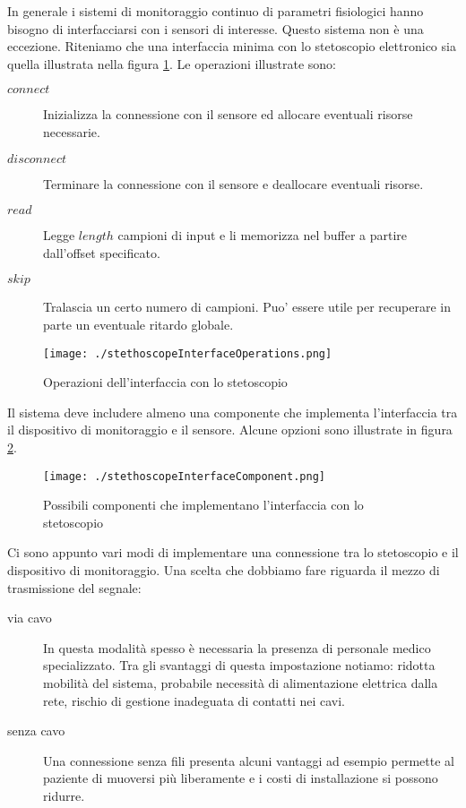 


In generale i sistemi di monitoraggio continuo di parametri fisiologici hanno bisogno di interfacciarsi con i sensori di interesse. 
Questo sistema non \`e una eccezione. 
Riteniamo che una interfaccia minima con lo stetoscopio elettronico sia quella illustrata nella figura \ref{interfacciastetoscopiominima}. Le operazioni illustrate sono:
\begin{description}
  \item[$connect$]
    Inizializza la connessione con il sensore ed allocare eventuali risorse necessarie.
  \item[$disconnect$]
    Terminare la connessione con il sensore e deallocare eventuali risorse.
  \item[$read$]
    Legge $length$ campioni di input e li memorizza nel buffer a partire dall'offset specificato.
  \item[$skip$]
    Tralascia un certo numero di campioni. Puo' essere utile per recuperare in parte un eventuale ritardo globale.
\end{description}



\begin{figure}
\centering
  \texttt{[image: ./stethoscopeInterfaceOperations.png]}
\caption{Operazioni dell'interfaccia con lo stetoscopio}
\label{interfacciastetoscopiominima}
\end{figure}



Il sistema deve includere almeno una componente che implementa l'interfaccia tra il dispositivo di monitoraggio e il sensore.
Alcune opzioni sono illustrate in figura \ref{componentiinterfacciastetoscopiominima}.

  \begin{figure}
  \centering
 \texttt{[image: ./stethoscopeInterfaceComponent.png]}
  \caption{Possibili componenti che implementano l'interfaccia con lo stetoscopio}
  \label{componentiinterfacciastetoscopiominima}
  \end{figure}

Ci sono appunto vari modi di implementare una connessione tra lo stetoscopio e il dispositivo di monitoraggio. Una scelta che dobbiamo fare riguarda il mezzo di trasmissione del segnale:
\begin{description}
  \item[via cavo]
    In questa modalit\`a spesso \`e necessaria la presenza di personale medico specializzato. Tra gli svantaggi di questa impostazione notiamo: ridotta mobilit\`a del sistema, probabile necessit\`a di alimentazione elettrica dalla rete, rischio di gestione inadeguata di contatti nei cavi.
  \item[senza cavo]
    Una connessione senza fili presenta alcuni vantaggi ad esempio permette al paziente di muoversi pi\`u liberamente e i costi di installazione si possono ridurre.
\end{description}

